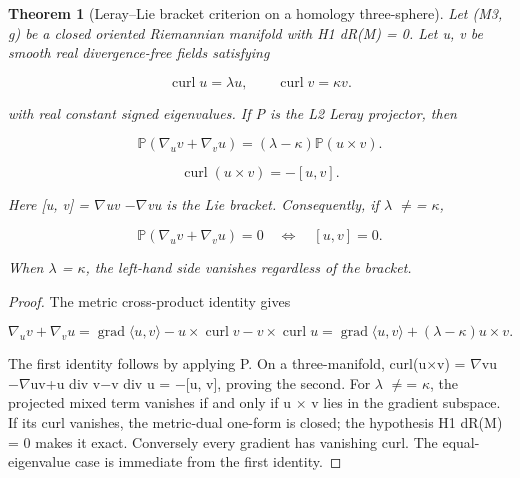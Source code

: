 \documentclass[10pt,letterpaper]{article}
\newtheorem{theorem}{Theorem}[section]
\theoremstyle{remark}
\begin{document}
\begin{theorem}[Leray–Lie bracket criterion on a homology three-sphere]

Let (M3, g) be a closed oriented Riemannian manifold with H1 dR(M) = 0. Let u, v be smooth real divergence-free fields satisfying


\begin{equation}
\tag{51}\label{eq:51}
\operatorname{curl}u=\lambda u,\qquad\operatorname{curl}v=\kappa v.
\end{equation}

with real constant signed eigenvalues. If P is the L2 Leray projector, then



\begin{equation}
\tag{52}\label{eq:52}
\mathbb P(\nabla_uv+\nabla_vu)=(\lambda-\kappa)\mathbb P(u\times v).
\end{equation}


\begin{equation}
\tag{53}\label{eq:53}
\operatorname{curl}(u\times v)=-[u,v].
\end{equation}

Here [u, v] = \(\nabla \)uv \(- \nabla \)vu is the Lie bracket. Consequently, if \(\lambda \) \(\ne \)= \(\kappa \),



\begin{equation}
\tag{54}\label{eq:54}
\mathbb P(\nabla_uv+\nabla_vu)=0\quad\Longleftrightarrow\quad[u,v]=0.
\end{equation}

When \(\lambda \) = \(\kappa \), the left-hand side vanishes regardless of the bracket.


\end{theorem}

\begin{proof}
The metric cross-product identity gives


\begin{equation}
\tag{55}\label{eq:55}
\nabla_uv+\nabla_vu=\operatorname{grad}\langle u,v\rangle-u\times\operatorname{curl}v-v\times\operatorname{curl}u=\operatorname{grad}\langle u,v\rangle+(\lambda-\kappa)u\times v.
\end{equation}

The first identity follows by applying P. On a three-manifold, curl(u\(\times \)v) = \(\nabla \)vu\(- \nabla \)uv+u div v\(- \)v div u = \(- \)[u, v], proving the second. For \(\lambda \) \(\ne \)= \(\kappa \), the projected mixed term vanishes if and only if u \(\times \) v lies in the gradient subspace. If its curl vanishes, the metric-dual one-form is closed; the hypothesis H1 dR(M) = 0 makes it exact. Conversely every gradient has vanishing curl. The equal-eigenvalue case is immediate from the first identity.


\end{proof}
\end{document}
